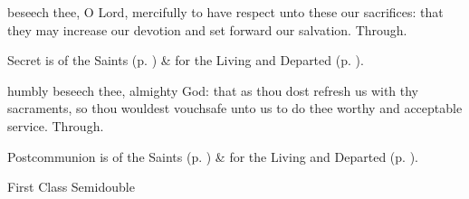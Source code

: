 \secret
{} beseech thee, O Lord, mercifully to have respect unto these our sacrifices: that they may increase our devotion and set forward our salvation. Through.
\begin{rubric}
     Secret is of the Saints (p. \pageref{SPSaints}) \&  for the Living and Departed (p. \pageref{SPLivingDeparted}).
\end{rubric}

\vspace{-1ex}

\postcommunion
{} humbly beseech thee, almighty God: that as thou dost refresh us with thy sacraments, so thou wouldest vouchsafe unto us to do thee worthy and acceptable service. Through.
\begin{rubric}
     Postcommunion is of the Saints (p. \pageref{SPSaints}) \&  for the Living and Departed (p. \pageref{SPLivingDeparted}).
\end{rubric}

\begin{inhead}
{First Class Semidouble}
\end{inhead}

\properantiphonfix

